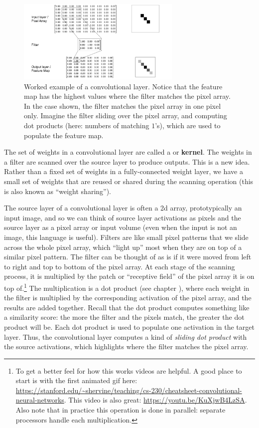 \begin{figure}[h]
\centering
\includegraphics[width=0.7\textwidth]{images/CNN_WorkedExample.png}
\caption[Jeff Yoshimi]{Worked example of a convolutional layer. Notice that the feature map has the highest values where the filter matches the pixel array. In the case shown, the filter matches the pixel array in one pixel only. Imagine the filter sliding over the pixel array, and computing dot products (here: numbers of matching $1$'s), which are used to populate the feature map.}
\label{cnn_workedExample}
\end{figure}

The set of weights in a convolutional layer are called a  or \textbf{kernel}. The weights in a filter are scanned over the source layer to produce outputs. This is a new idea. Rather than a fixed set of weights in a fully-connected weight layer, we have a small set of weights that are reused or shared during the scanning operation (this is also known as ``weight sharing'').

 The source layer of a convolutional layer is often a 2d array, prototypically an input image, and so we can think of source layer activations as pixels and the source layer as a pixel array or input volume (even when the input is not an image, this language is useful). Filters are like small pixel patterns that we slide across the whole pixel array, which ``light up'' most when they are on top of a similar pixel pattern. The filter can be thought of as is if it were moved from left to right and top to bottom of the pixel array. At each stage of the scanning process, it is multiplied by the patch or ``receptive field''  of the pixel array it is on top of.\footnote{To get a better feel for how this works videos are helpful. A good place  to start is with the first animated gif here: \url{https://stanford.edu/~shervine/teaching/cs-230/cheatsheet-convolutional-neural-networks}. This video is also great: \url{https://youtu.be/KuXjwB4LzSA}. Also note that in practice this operation is done in parallel: separate processors handle each multiplication.} The multiplication is a dot product (see chapter ), where each weight in the filter is multiplied by the corresponding activation of the pixel array, and the results are added together. Recall that the dot product computes something like a similarity score: the more the filter and the pixels match, the greater the dot product will be. Each dot product is used to populate one activation in the target layer. Thus, the convolutional layer computes a kind of \emph{sliding dot product} with the source activations, which highlights where the filter matches the pixel array.
 
